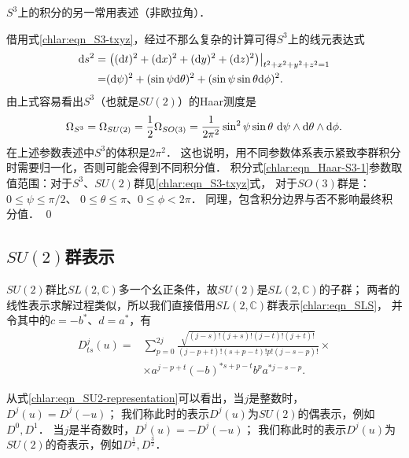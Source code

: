 \begin{example}
	$S^3$上的积分的另一常用表述（非欧拉角）．
\end{example}

借用式\eqref{chlar:eqn_S3-txyz}，经过不那么复杂的计算可得$S^3$上的线元表达式
\begin{align*}
	{\rm d} s^2 =& \left.\left(({\rm d} t)^2 + ({\rm d} x)^2 + ({\rm d} y)^2 + ({\rm d} z)^2
	\right)\right|_{t^2+x^2+y^2+z^2=1}   \\
	=& ({\rm d} \psi)^2 + (\sin \psi {\rm d} \theta)^2  + (\sin\psi\sin\theta {\rm d} \phi)^2 .
\end{align*}
由上式容易看出$S^3$（也就是$SU(2)$）的Haar测度是
\begin{equation}\label{chlar:eqn_Haar-S3-1}
	\Omega_{S^3} =\Omega_{SU(2)} = \frac{1}{2}\Omega_{SO(3)}
	= \frac{1}{2\pi^2} \sin^2\psi \sin\theta \  {\rm d} \psi\wedge {\rm d} \theta \wedge  {\rm d} \phi .
\end{equation}
在上述参数表述中$S^3$的体积是$2\pi^2$．
这也说明，用不同参数体系表示紧致李群积分时需要归一化，否则可能会得到不同积分值．
积分式\eqref{chlar:eqn_Haar-S3-1}参数取值范围：对于$S^3$、$SU(2)$群见\eqref{chlar:eqn_S3-txyz}式，
对于$SO(3)$群是：$0 \leqslant \psi \leqslant \pi/2$、
$ 0\leqslant \theta \leqslant \pi $、$0\leqslant \phi  < 2\pi$．
同理，包含积分边界与否不影响最终积分值．
\qed


\subsection{$SU(2)$群表示}

$SU(2)$群比$SL(2,\mathbb{C})$多一个幺正条件，故$SU(2)$是$SL(2,\mathbb{C})$的子群；
两者的线性表示求解过程类似，所以我们直接借用$SL(2,\mathbb{C})$群表示\eqref{chlar:eqn_SLS}，
并令其中的$c=-b^*$、$d=a^*$，有
\begin{equation}\label{chlar:eqn_SU2-representation}
    \begin{aligned}
        D^{j}_{ts}(u) =&  \sum_{p=0}^{2j} 
        \frac{\sqrt{(j-s)! (j+s)! (j-t)! (j+t)!}  }
        { (j-p+t)! (s+p-t)! p!(j-s-p)! }\times \\
        & \times a^{j-p+t} (-b)^{*s+p-t} b^{p} a^{*j-s-p} .
    \end{aligned}
\end{equation} %


从式\eqref{chlar:eqn_SU2-representation}可以看出，当$j$是整数时，$D^j(u)=D^j(-u)$；
我们称此时的表示$D^j(u)$为$SU(2)$的{\heiti 偶表示}，例如$D^0, D^1$．
当$j$是半奇数时，$D^j(u)=-D^j(-u)$；
我们称此时的表示$D^j(u)$为$SU(2)$的{\heiti 奇表示}，例如$D^{\frac{1}{2}}, D^{\frac{3}{2}}$．

